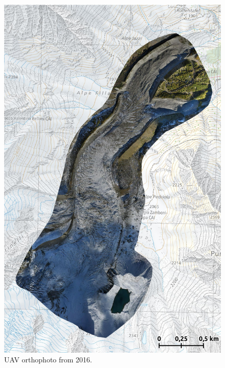 \begin{figure}[p]
    \centering
    \includegraphics[height=\textheight]{figures/appendix/orto_2016.jpg}
    \caption{UAV orthophoto from 2016.}
\end{figure}

